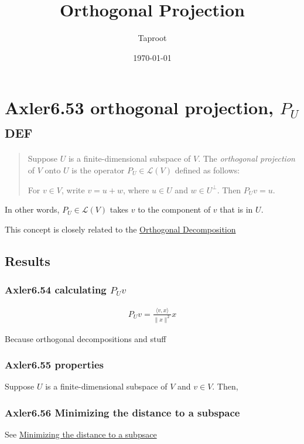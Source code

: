 \documentclass[letterpaper]{article}
\author{Taproot}
\date{\today}
\title{Orthogonal Projection}
\renewcommand{\tableofcontents}{}
\begin{document}
\tableofcontents

\section{Axler6.53 orthogonal projection, \(P_U\)\hfill{}\textsc{def}}
\label{sec:orgbf3711b}
\begin{quote}
Suppose \(U\) is a finite-dimensional subspace of \(V\). The \emph{orthogonal projection} of \(V\) onto \(U\) is the operator \(P_U \in\mathcal{L} (V)\) defined as follows:

For \(v \in  V\), write \(v = u + w\), where \(u \in  U\) and \(w \in  U^\bot\). Then \(P_Uv = u\).
\end{quote}
In other words, \(P_U \in \mathcal{L} (V)\) takes \(v\) to the component of \(v\) that is in \(U\).

This concept is closely related to the \href{KBrefOrthogonalDecomposition.org}{Orthogonal Decomposition}
\subsection{Results}
\label{sec:org282f322}
\subsubsection{Axler6.54 calculating \(P_U v\)}
\label{sec:org737a135}

\[\begin{aligned}
    P_U v = \frac{\langle  v, x \rangle}{\lVert x \rVert ^2} x
	\end{aligned}\]

Because orthogonal decompositions and stuff
\subsubsection{Axler6.55 properties}
\label{sec:orgf80df56}
Suppose \(U\) is a finite-dimensional subspace of \(V\) and \(v \in  V\). Then,
\subsubsection{Axler6.56 Minimizing the distance to a subspace}
\label{sec:org7fdcc07}
See \href{KBrefMinimizingDistanceToSubspace.org}{Minimizing the distance to a subpsace}
\end{document}
